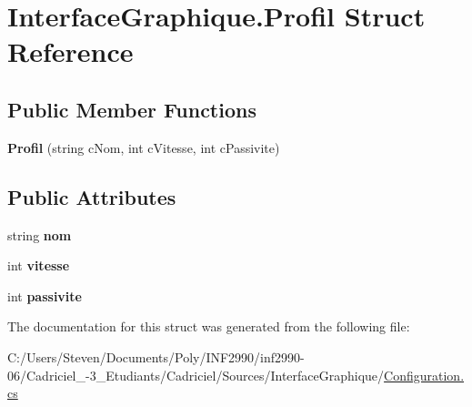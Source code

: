 \hypertarget{struct_interface_graphique_1_1_profil}{}\section{Interface\+Graphique.\+Profil Struct Reference}
\label{struct_interface_graphique_1_1_profil}
\subsection*{Public Member Functions}
\begin{DoxyCompactItemize}
\item 
{\bfseries Profil} (string c\+Nom, int c\+Vitesse, int c\+Passivite)
\end{DoxyCompactItemize}
\subsection*{Public Attributes}
\begin{DoxyCompactItemize}
\item 
string {\bfseries nom}
\item 
int {\bfseries vitesse}
\item 
int {\bfseries passivite}
\end{DoxyCompactItemize}


The documentation for this struct was generated from the following file\+:\begin{DoxyCompactItemize}
\item 
C\+:/\+Users/\+Steven/\+Documents/\+Poly/\+I\+N\+F2990/inf2990-\/06/\+Cadriciel\+\_-\/3\+\_\+\+Etudiants/\+Cadriciel/\+Sources/\+Interface\+Graphique/\hyperlink{_configuration_8cs}{Configuration.\+cs}\end{DoxyCompactItemize}
